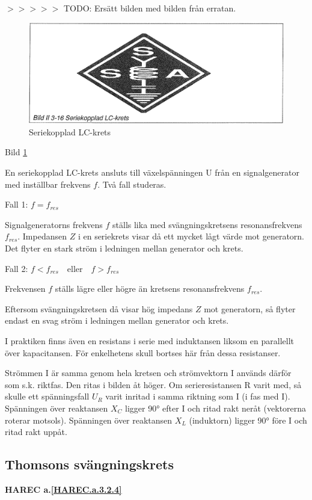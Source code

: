 $>>>>>$ TODO: Ersätt bilden med bilden från erratan.

\begin{figure}
\includegraphics[width=\textwidth]{images/bild_2_3-16}
\caption{Seriekopplad LC-krets}
\label{fig:BildII3-16}
\end{figure}

Bild \ref{fig:BildII3-16}

En seriekopplad LC-krets ansluts till växelspänningen U från en signalgenerator
med inställbar frekvens \(f\). Två fall studeras.

Fall 1: \(f = f_{res}\)

Signalgeneratorns frekvens \(f\) ställs lika med svängningskretsens
resonansfrekvens \(f_{res}\). Impedansen \(Z\) i en seriekrets visar då ett
mycket lågt värde mot generatorn. Det flyter en stark ström i ledningen mellan
generator och krets.

Fall 2: \(f < f_{res} \quad \text{eller} \quad f > f_{res}\)

Frekvensen \(f\) ställs lägre eller högre än kretsens resonansfrekvens
\(f_{res}\).

Eftersom svängningskretsen då visar hög impedans \(Z\) mot generatorn, så
flyter endast en svag ström i ledningen mellan generator och krets.

I praktiken finns även en resistans i serie med induktansen liksom en
parallellt över kapacitansen. För enkelhetens skull bortses här från dessa
resistanser.

Strömmen I är samma genom hela kretsen och strömvektorn I används därför som
s.k. riktfas. Den ritas i bilden åt höger. Om serieresistansen R varit med, så
skulle ett spänningsfall \(U_R\) varit inritad i samma riktning som I
(i fas med I). Spänningen över reaktansen \(X_C\) ligger 90° efter I och ritad
rakt neråt (vektorerna roterar motsols). Spänningen över reaktansen \(X_L\)
(induktorn) ligger 90° före I och ritad rakt uppåt.

\subsection{Thomsons svängningskrets}
\textbf{HAREC a.\ref{HAREC.a.3.2.4}\label{myHAREC.a.3.2.4}}

